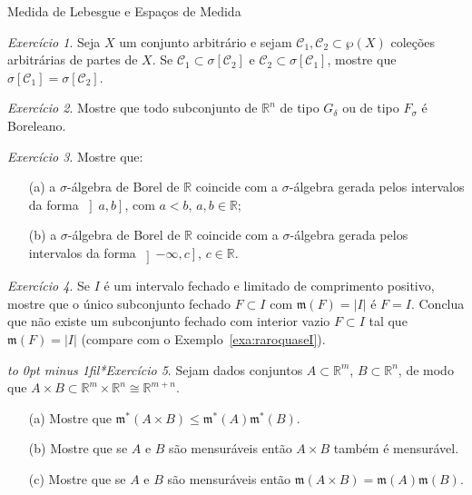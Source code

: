 \documentclass[oneside,final,11pt]{amsbook}
\newcommand{\R}{\mathds R}
\newcommand{\leb}{\mathfrak m}
\theoremstyle{remark}\newtheorem{exercise}{Exercício}[chapter]
\theoremstyle{remark}\newtheorem{*exercise}[exercise]{\hbox to 0pt{\hskip 0pt minus 1fil*}Exercício}
\theoremstyle{definition}\newtheorem{exdefin}{Definição}[chapter]
\theoremstyle{plain}\newtheorem{teo}{Teorema}[section]
\theoremstyle{plain}\newtheorem{lem}[teo]{Lema}
\theoremstyle{plain}\newtheorem{prop}[teo]{Proposição}
\theoremstyle{plain}\newtheorem{cor}[teo]{Corolário}
\theoremstyle{definition}\newtheorem{defin}[teo]{Definição}
\theoremstyle{remark}\newtheorem{rem}[teo]{Observação}
\theoremstyle{definition}\newtheorem{notation}[teo]{Notação}
\theoremstyle{definition}\newtheorem{convention}[teo]{Convenção}
\theoremstyle{definition}\newtheorem{example}[teo]{Exemplo}
\numberwithin{section}{chapter}
\numberwithin{equation}{section}
\begin{document}
\begin{chapter}{Medida de Lebesgue e Espaços de Medida}
\begin{exercise}\label{exe:relacionargeradas}
Seja $X$ um conjunto arbitrário e sejam $\mathcal C_1,\mathcal C_2\subset\wp(X)$ coleções arbitrárias de partes de $X$.
Se $\mathcal C_1\subset\sigma[\mathcal C_2]$ e $\mathcal C_2\subset\sigma[\mathcal C_1]$, mostre que
$\sigma[\mathcal C_1]=\sigma[\mathcal C_2]$.
\end{exercise}

\begin{exercise}\label{exe:GdeltaFsigmaBorel}
Mostre que todo subconjunto de $\R^n$ de tipo $G_\delta$ ou de tipo $F_\sigma$ é Boreleano.
\end{exercise}

\begin{exercise}\label{exe:BorelRgeradores}
Mostre que:
\begin{itemize}
\item[(a)] a $\sigma$-álgebra de Borel de $\R$ coincide com a $\sigma$-álgebra gerada pelos intervalos da forma
$\left]a,b\right]$, com $a<b$, $a,b\in\R$;
\item[(b)] a $\sigma$-álgebra de Borel de $\R$ coincide com a $\sigma$-álgebra gerada pelos intervalos da forma
$\left]-\infty,c\right]$, $c\in\R$.
\end{itemize}
\end{exercise}

\begin{exercise}\label{exe:rarotudonaoda}
Se $I$ é um intervalo fechado e limitado de comprimento positivo, mostre que o único subconjunto
fechado $F\subset I$ com $\leb(F)=\vert I\vert$ é $F=I$. Conclua que não existe um subconjunto
fechado com interior vazio $F\subset I$ tal que $\leb(F)=\vert I\vert$ (compare com o
Exemplo~\ref{exa:raroquaseI}).
\end{exercise}

\begin{*exercise}\label{exe:medLebproduto}
Sejam dados conjuntos $A\subset\R^m$, $B\subset\R^n$, de modo que $A\times B\subset\R^m\times\R^n\cong\R^{m+n}$.
\begin{itemize}
\item[(a)] Mostre que $\leb^*(A\times B)\le\leb^*(A)\leb^*(B)$.
\item[(b)] Mostre que se $A$ e $B$ são mensuráveis então $A\times B$ também é mensurável.
\item[(c)] Mostre que se $A$ e $B$ são mensuráveis então $\leb(A\times B)=\leb(A)\leb(B)$.
\end{itemize}
\end{*exercise}


\end{chapter}
\end{document}

